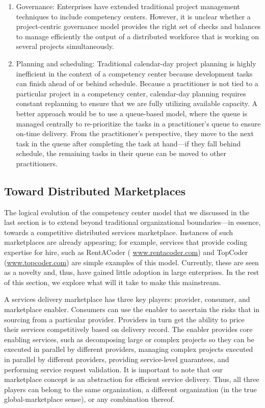 \begin{enumerate}
\item Governance: Enterprises have extended traditional project management
  techniques to include competency centers. However, it is unclear whether a
  project-centric governance model provides the right set of checks and balances
  to manage efficiently the output of a distributed workforce that is working on
  several projects simultaneously.

\item Planning and scheduling: Traditional calendar-day project planning is
  highly inefficient in the context of a competency center because development
  tasks can finish ahead of or behind schedule. Because a practitioner is not
  tied to a particular project in a competency center, calendar-day planning
  requires constant replanning to ensure that we are fully utilizing available
  capacity. A better approach would be to use a queue-based model, where the
  queue is managed centrally to re-prioritize the tasks in a practitioner's
  queue to ensure on-time delivery. From the practitioner's perspective, they
  move to the next task in the queue after completing the task at hand---if
  they fall behind schedule, the remaining tasks in their queue can be moved to
  other practitioners.

\end{enumerate}

\subsection{Toward Distributed Marketplaces}

The logical evolution of the competency center model that we discussed in the
last section is to extend beyond traditional organizational boundaries---in
essence, towards a competitive distributed services marketplace. Instances of
such marketplaces are already appearing; for example, services that provide
coding expertise for hire, such as RentACoder ({\small
  \url{www.rentacoder.com}}) and TopCoder ({\small \url{www.topcoder.com}}) are
simple examples of this model. Currently, these are seen as a novelty and, thus,
have gained little adoption in large enterprises. In the rest of this section,
we explore what will it take to make this mainstream.

A services delivery marketplace has three key players: provider, consumer, and
marketplace enabler. Consumers can use the enabler to ascertain the risks that
in sourcing from a particular provider. Providers in turn get the ability to
price their services competitively based on delivery record. The enabler
provides core enabling services, such as decomposing large or complex projects
so they can be executed in parallel by different providers, managing complex
projects executed in parallel by different providers, providing service-level
guarantees, and performing service request validation. It is important to note
that our marketplace concept is an abstraction for efficient service
delivery. Thus, all three players can belong to the same organization, a
different organization (in the true global-marketplace sense), or any
combination thereof.

